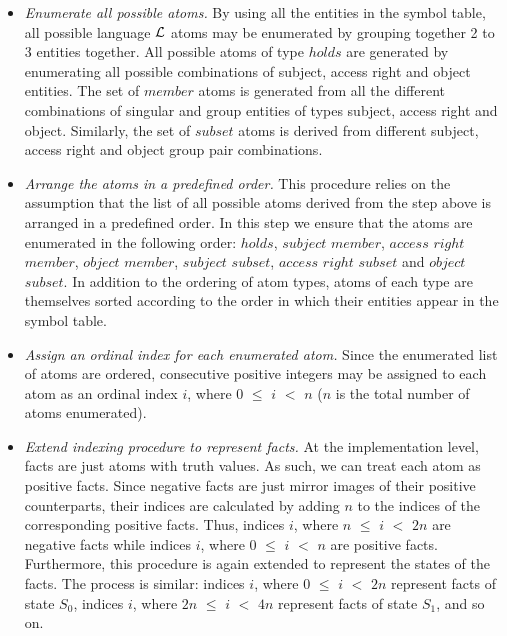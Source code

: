 \documentclass[global,twocolumn,final]{svjour}
\begin{document}
          \begin{itemize}

            \item
              {\em Enumerate all possible atoms.}
              By using all the entities in the symbol table, all possible
              language ${\cal L}$ atoms may be enumerated by grouping together
              2 to 3 entities together. All possible atoms of type $holds$ are
              generated by enumerating all possible combinations of subject,
              access right and object entities. The set of $member$ atoms is
              generated from all the different combinations of singular and
              group entities of types subject, access right and object.
              Similarly, the set of $subset$ atoms is derived from different
              subject, access right and object group pair combinations.

            \item
              {\em Arrange the atoms in a predefined order.}
              This procedure relies on the assumption that the list of all
              possible atoms derived from the step above is arranged in a
              predefined order. In this step we ensure that the atoms are
              enumerated in the following order: $holds$, $subject$ $member$,
              $access$ $right$ $member$, $object$ $member$, $subject$
              $subset$, $access$ $right$ $subset$ and $object$ $subset$. In
              addition to the ordering of atom types, atoms of each type are
              themselves sorted according to the order in which their entities
              appear in the symbol table.

            \item
              {\em Assign an ordinal index for each enumerated atom.}
              Since the enumerated list of atoms are ordered, consecutive
              positive integers may be assigned to each atom as an ordinal
              index $i$, where $0$ $\leq$ $i$ $<$ $n$ ($n$ is the total number
              of atoms enumerated).

            \item
              {\em Extend indexing procedure to represent facts.} At the
              implementation level, facts are just atoms with truth values.
              As such, we can treat each atom as positive facts. Since negative
              facts are just mirror images of their positive counterparts,
              their indices are calculated by adding $n$ to the indices of the
              corresponding positive facts. Thus, indices $i$, where $n$ $\leq$
              $i$ $<$ $2n$ are negative facts while indices $i$, where $0$
              $\leq$ $i$ $<$ $n$ are positive facts. Furthermore, this
              procedure is again extended to represent the states of the
              facts. The process is similar: indices $i$, where $0$ $\leq$ $i$
              $<$ $2n$ represent facts of state $S_{0}$, indices $i$, where
              $2n$ $\leq$ $i$ $<$ $4n$ represent facts of state $S_{1}$, and
              so on.
          \end{itemize}
\end{document}
